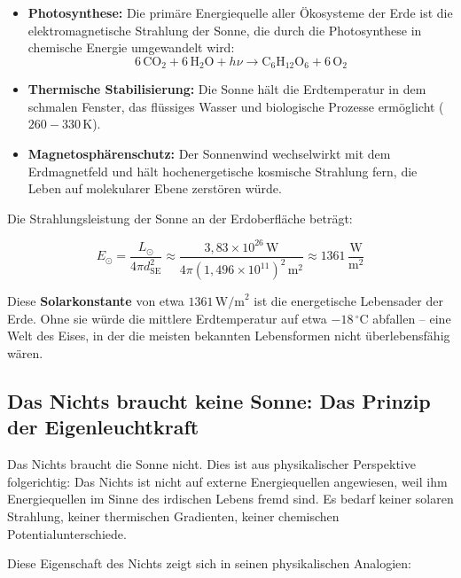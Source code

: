 ﻿\documentclass[12pt,a4paper]{report}
\begin{document}
\begin{itemize}
	\item \textbf{Photosynthese:} Die primäre Energiequelle aller Ökosysteme der Erde ist die elektromagnetische Strahlung der Sonne, die durch die Photosynthese in chemische Energie umgewandelt wird:
	\begin{equation}
		6\,\text{CO}_2 + 6\,\text{H}_2\text{O} + h\nu \longrightarrow \text{C}_6\text{H}_{12}\text{O}_6 + 6\,\text{O}_2
		\label{eq:photosynthese}
	\end{equation}
	\item \textbf{Thermische Stabilisierung:} Die Sonne hält die Erdtemperatur in dem schmalen Fenster, das flüssiges Wasser und biologische Prozesse ermöglicht ($260 - 330\,\text{K}$).
	\item \textbf{Magnetosphärenschutz:} Der Sonnenwind wechselwirkt mit dem Erdmagnetfeld und hält hochenergetische kosmische Strahlung fern, die Leben auf molekularer Ebene zerstören würde.
\end{itemize}

Die Strahlungsleistung der Sonne an der Erdoberfläche beträgt:

\begin{equation}
	E_{\odot} = \frac{L_{\odot}}{4\pi d_{\text{SE}}^2} \approx \frac{3{,}83 \times 10^{26}\,\text{W}}{4\pi (1{,}496 \times 10^{11})^2\,\text{m}^2} \approx 1361\,\frac{\text{W}}{\text{m}^2}
	\label{eq:solarkonstante}
\end{equation}

Diese \textbf{Solarkonstante} von etwa $1361\,\text{W/m}^2$ ist die energetische Lebensader der Erde. Ohne sie würde die mittlere Erdtemperatur auf etwa $-18\,^{\circ}\text{C}$ abfallen -- eine Welt des Eises, in der die meisten bekannten Lebensformen nicht überlebensfähig wären.

\subsection{Das Nichts braucht keine Sonne: Das Prinzip der Eigenleuchtkraft}

Das Nichts braucht die Sonne nicht. Dies ist aus physikalischer Perspektive folgerichtig: Das Nichts ist nicht auf externe Energiequellen angewiesen, weil ihm Energiequellen im Sinne des irdischen Lebens fremd sind. Es bedarf keiner solaren Strahlung, keiner thermischen Gradienten, keiner chemischen Potentialunterschiede.

Diese Eigenschaft des Nichts zeigt sich in seinen physikalischen Analogien:
\end{document}

